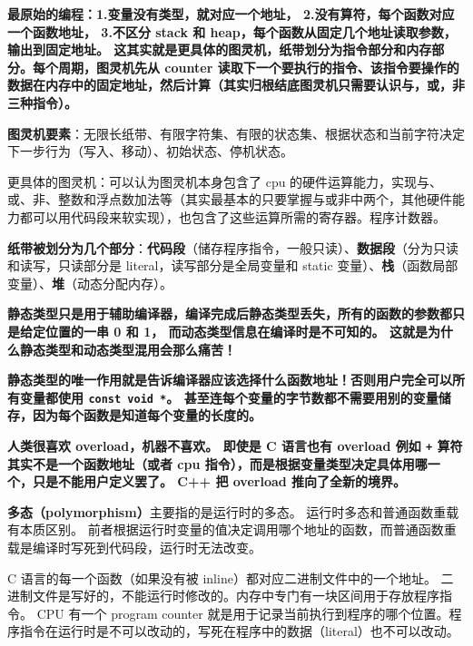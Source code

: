 
\begin{issues}
\issueDraft
\end{issues}

\textbf{最原始的编程：1.变量没有类型，就对应一个地址， 2.没有算符，每个函数对应一个函数地址， 3.不区分 stack 和 heap，每个函数从固定几个地址读取参数，输出到固定地址。 这其实就是更具体的图灵机，纸带划分为指令部分和内存部分。每个周期，图灵机先从 counter 读取下一个要执行的指令、该指令要操作的数据在内存中的固定地址，然后计算（其实归根结底图灵机只需要认识与，或，非三种指令）。}

\textbf{图灵机要素}：无限长纸带、有限字符集、有限的状态集、根据状态和当前字符决定下一步行为（写入、移动）、初始状态、停机状态。

更具体的图灵机：可以认为图灵机本身包含了 cpu 的硬件运算能力，实现与、或、非、整数和浮点数加法等（其实最基本的只要掌握与或非中两个，其他硬件能力都可以用代码段来软实现），也包含了这些运算所需的寄存器。程序计数器。

\textbf{纸带被划分为几个部分}：\textbf{代码段}（储存程序指令，一般只读）、\textbf{数据段}（分为只读和读写，只读部分是 literal，读写部分是全局变量和 static 变量）、\textbf{栈}（函数局部变量）、\textbf{堆}（动态分配内存）。

\textbf{静态类型只是用于辅助编译器，编译完成后静态类型丢失，所有的函数的参数都只是给定位置的一串 0 和 1， 而动态类型信息在编译时是不可知的。 这就是为什么静态类型和动态类型混用会那么痛苦！}

\textbf{静态类型的唯一作用就是告诉编译器应该选择什么函数地址！否则用户完全可以所有变量都使用 \verb`const void *`。 甚至连每个变量的字节数都不需要用别的变量储存，因为每个函数是知道每个变量的长度的。}

\textbf{人类很喜欢 overload，机器不喜欢。 即使是 C 语言也有 overload 例如 \verb`+` 算符其实不是一个函数地址（或者 cpu 指令），而是根据变量类型决定具体用哪一个，只是不能用户定义罢了。 C++ 把 overload 推向了全新的境界。}

\textbf{多态（polymorphism）}主要指的是运行时的多态。 运行时多态和普通函数重载有本质区别。 前者根据运行时变量的值决定调用哪个地址的函数，而普通函数重载是编译时写死到代码段，运行时无法改变。

C 语言的每一个函数（如果没有被 inline）都对应二进制文件中的一个地址。 二进制文件是写好的，不能运行时修改的。内存中专门有一块区间用于存放程序指令。 CPU 有一个 program counter 就是用于记录当前执行到程序的哪个位置。程序指令在运行时是不可以改动的，写死在程序中的数据（literal）也不可以改动。


